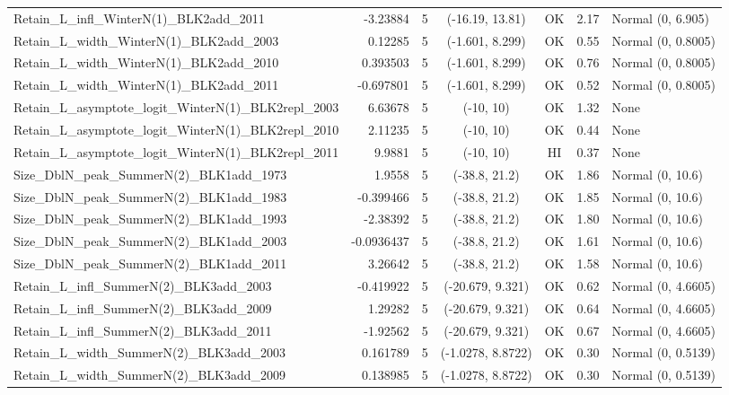 \documentclass[12pt,]{article}
\begin{document}
\begin{landscape}
\begin{longtable}{lrcccll}
  Retain\_L\_infl\_WinterN(1)\_BLK2add\_2011 & -3.23884 & 5 & (-16.19, 13.81) & OK & 2.17 & Normal (0, 6.905) \\ 
  Retain\_L\_width\_WinterN(1)\_BLK2add\_2003 & 0.12285 & 5 & (-1.601, 8.299) & OK & 0.55 & Normal (0, 0.8005) \\ 
  Retain\_L\_width\_WinterN(1)\_BLK2add\_2010 & 0.393503 & 5 & (-1.601, 8.299) & OK & 0.76 & Normal (0, 0.8005) \\ 
  Retain\_L\_width\_WinterN(1)\_BLK2add\_2011 & -0.697801 & 5 & (-1.601, 8.299) & OK & 0.52 & Normal (0, 0.8005) \\ 
  Retain\_L\_asymptote\_logit\_WinterN(1)\_BLK2repl\_2003 & 6.63678 & 5 & (-10, 10) & OK & 1.32 & None \\ 
  Retain\_L\_asymptote\_logit\_WinterN(1)\_BLK2repl\_2010 & 2.11235 & 5 & (-10, 10) & OK & 0.44 & None \\ 
  Retain\_L\_asymptote\_logit\_WinterN(1)\_BLK2repl\_2011 & 9.9881 & 5 & (-10, 10) & HI & 0.37 & None \\ 
  Size\_DblN\_peak\_SummerN(2)\_BLK1add\_1973 & 1.9558 & 5 & (-38.8, 21.2) & OK & 1.86 & Normal (0, 10.6) \\ 
  Size\_DblN\_peak\_SummerN(2)\_BLK1add\_1983 & -0.399466 & 5 & (-38.8, 21.2) & OK & 1.85 & Normal (0, 10.6) \\ 
  Size\_DblN\_peak\_SummerN(2)\_BLK1add\_1993 & -2.38392 & 5 & (-38.8, 21.2) & OK & 1.80 & Normal (0, 10.6) \\ 
  Size\_DblN\_peak\_SummerN(2)\_BLK1add\_2003 & -0.0936437 & 5 & (-38.8, 21.2) & OK & 1.61 & Normal (0, 10.6) \\ 
  Size\_DblN\_peak\_SummerN(2)\_BLK1add\_2011 & 3.26642 & 5 & (-38.8, 21.2) & OK & 1.58 & Normal (0, 10.6) \\ 
  Retain\_L\_infl\_SummerN(2)\_BLK3add\_2003 & -0.419922 & 5 & (-20.679, 9.321) & OK & 0.62 & Normal (0, 4.6605) \\ 
  Retain\_L\_infl\_SummerN(2)\_BLK3add\_2009 & 1.29282 & 5 & (-20.679, 9.321) & OK & 0.64 & Normal (0, 4.6605) \\ 
  Retain\_L\_infl\_SummerN(2)\_BLK3add\_2011 & -1.92562 & 5 & (-20.679, 9.321) & OK & 0.67 & Normal (0, 4.6605) \\ 
  Retain\_L\_width\_SummerN(2)\_BLK3add\_2003 & 0.161789 & 5 & (-1.0278, 8.8722) & OK & 0.30 & Normal (0, 0.5139) \\ 
  Retain\_L\_width\_SummerN(2)\_BLK3add\_2009 & 0.138985 & 5 & (-1.0278, 8.8722) & OK & 0.30 & Normal (0, 0.5139) \\ 

\end{longtable}
\end{landscape}
\end{document}
